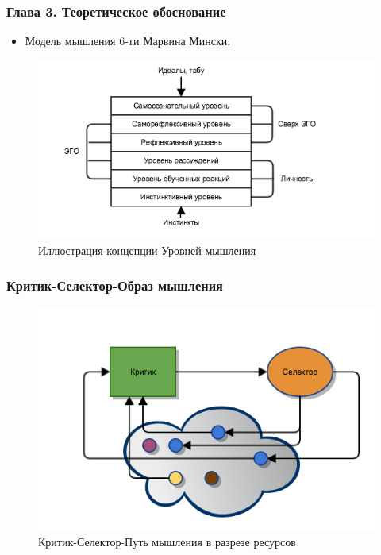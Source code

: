 \documentclass[14pt]{beamer}
\begin{document}
\begin{frame}
\frametitle{Глава 3. Теоретическое обоснование}
	\begin{itemize}
		\item  Модель мышления 6-ти Марвина Мински.
	\end{itemize}
\begin{figure} [h] 
  \center
  \includegraphics [scale=0.6] {thinkinglevels}
  \caption{Иллюстрация концепции Уровней мышления} 
  \label{img:thinkinglevels}  
\end{figure}
\end{frame}


\begin{frame}
\frametitle{Критик-Селектор-Образ мышления}
\begin{figure} [h] 
  \center
  \includegraphics [scale=0.6] {CSW_EX}
  \caption{Критик-Селектор-Путь мышления в разрезе ресурсов} 
  \label{img:csw_ex}  
\end{figure}
\end{frame}
\end{document}
